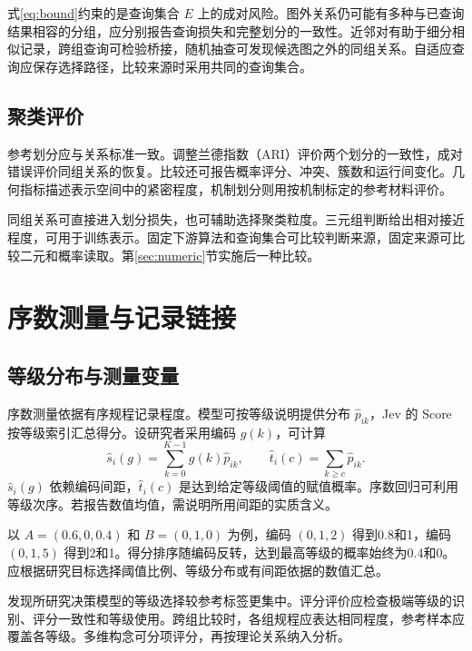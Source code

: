 \documentclass[UTF8,a4paper,zihao=-4,fontset=fandol]{ctexart}
\begin{document}
式\eqref{eq:bound}约束的是查询集合 $E$ 上的成对风险。图外关系仍可能有多种与已查询结果相容的分组，应分别报告查询损失和完整划分的一致性。近邻对有助于细分相似记录，跨组查询可检验桥接，随机抽查可发现候选图之外的同组关系。自适应查询应保存选择路径，比较来源时采用共同的查询集合。

\subsection{聚类评价}

参考划分应与关系标准一致。调整兰德指数（ARI）评价两个划分的一致性，成对错误评价同组关系的恢复\citep{hubert1985}。比较还可报告概率评分、冲突、簇数和运行间变化。几何指标描述表示空间中的紧密程度，机制划分则用按机制标定的参考材料评价。

同组关系可直接进入划分损失，也可辅助选择聚类粒度。三元组判断给出相对接近程度，可用于训练表示。固定下游算法和查询集合可比较判断来源，固定来源可比较二元和概率读取。第\ref{sec:numeric}节实施后一种比较。

\section{序数测量与记录链接}\label{sec:extensions}

\subsection{等级分布与测量变量}

序数测量依据有序规程记录程度。模型可按等级说明提供分布 $\widehat p_{ik}$，Jev 的 Score 按等级索引汇总得分\citep{typesafe-score}。设研究者采用编码 $g(k)$，可计算
\begin{equation}
 \widehat s_i(g)=\sum_{k=0}^{K-1}g(k)\widehat p_{ik},\qquad
 \widehat t_i(c)=\sum_{k\geq c}\widehat p_{ik}.
 \label{eq:ordinal}
\end{equation}
$\widehat s_i(g)$ 依赖编码间距，$\widehat t_i(c)$ 是达到给定等级阈值的赋值概率。序数回归可利用等级次序\citep{mccullagh1980}。若报告数值均值，需说明所用间距的实质含义。

以 $A=(0.6,0,0.4)$ 和 $B=(0,1,0)$ 为例，编码 $(0,1,2)$ 得到0.8和1，编码 $(0,1,5)$ 得到2和1。得分排序随编码反转，达到最高等级的概率始终为0.4和0。应根据研究目标选择阈值比例、等级分布或有间距依据的数值汇总。

\citet{gao2026}发现所研究决策模型的等级选择较参考标签更集中。评分评价应检查极端等级的识别、评分一致性和等级使用。跨组比较时，各组规程应表达相同程度，参考样本应覆盖各等级。多维构念可分项评分，再按理论关系纳入分析。
\end{document}
